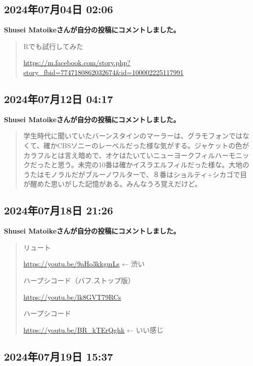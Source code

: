 \subsection*{2024年07月04日 02:06}

\textbf{Shusei Matoikeさんが自分の投稿にコメントしました。}

\begin{quote}
Rでも試行してみた

\url{https://m.facebook.com/story.php?story_fbid=7747180862032674&id=100002225117991}
\end{quote}

\subsection*{2024年07月12日 04:17}

\textbf{Shusei Matoikeさんが自分の投稿にコメントしました。}

\begin{quote}
学生時代に聞いていたバーンスタインのマーラーは、グラモフォンではなくて、確かCBSソニーのレーベルだった様な気がする。ジャケットの色がカラフルとは言え暗めで、オケはたいていニューヨークフィルハーモニックだったと思う。未完の10番は確かイスラエルフィルだった様な。大地のうたはモノラルだがブルーノワルターで、８番はショルティ+シカゴで目が醒めた思いがした記憶がある。みんなうろ覚えだけど。
\end{quote}

\subsection*{2024年07月18日 21:26}

\textbf{Shusei Matoikeさんが自分の投稿にコメントしました。}

\begin{quote}
リュート

\url{https://youtu.be/9aHo3kkgmLs} ← 渋い

ハープシコード（バフ.ストップ版）

\url{https://youtu.be/lk8GVT79RCs}

ハープシコード

\url{https://youtu.be/BR_kTErQghk} ← いい感じ
\end{quote}

\subsection*{2024年07月19日 15:37}

